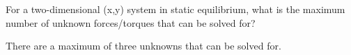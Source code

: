For a two-dimensional (x,y) system in static equilibrium, what is the maximum number of unknown forces/torques that can be solved for?

\begin{solution}
    There are a maximum of three unknowns that can be solved for.
\end{solution}